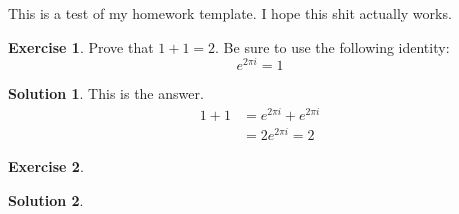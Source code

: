 \documentclass[12pt]{article}
\theoremstyle{definition}
\newtheorem{exer}{Exercise}
\newtheorem{sol}{Solution}
\theoremstyle{remark}
\begin{document}
This is a test of my homework template. I hope this shit actually works.

\begin{exer}
    Prove that $1+1 = 2$. Be sure to use the following identity:
    \begin{equation*}
        e^{2\pi i} = 1
    \end{equation*}
\end{exer}

\begin{sol}
    This is the answer.
    \begin{align}
        1 + 1 &= e^{2\pi i} + e^{2 \pi i}\\
        &= 2e^{2\pi i} = 2
    \end{align}
\end{sol}

\begin{exer}
\end{exer}

\begin{sol}
\end{sol}
\end{document}
